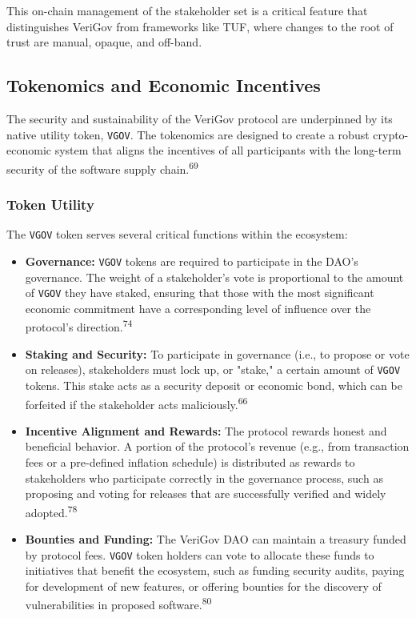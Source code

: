 \documentclass{article}
\begin{document}
This on-chain management of the stakeholder set is a critical feature that distinguishes VeriGov from frameworks like TUF, where changes to the root of trust are manual, opaque, and off-band.

\subsection{Tokenomics and Economic Incentives}

The security and sustainability of the VeriGov protocol are underpinned by its native utility token, \lstinline{VGOV}. The tokenomics are designed to create a robust crypto-economic system that aligns the incentives of all participants with the long-term security of the software supply chain.\textsuperscript{69}

\subsubsection{Token Utility}

The \lstinline{VGOV} token serves several critical functions within the ecosystem:

\begin{itemize}
\item \textbf{Governance:} \lstinline{VGOV} tokens are required to participate in the DAO's governance. The weight of a stakeholder's vote is proportional to the amount of \lstinline{VGOV} they have staked, ensuring that those with the most significant economic commitment have a corresponding level of influence over the protocol's direction.\textsuperscript{74}
\item \textbf{Staking and Security:} To participate in governance (i.e., to propose or vote on releases), stakeholders must lock up, or "stake," a certain amount of \lstinline{VGOV} tokens. This stake acts as a security deposit or economic bond, which can be forfeited if the stakeholder acts maliciously.\textsuperscript{66}
\item \textbf{Incentive Alignment and Rewards:} The protocol rewards honest and beneficial behavior. A portion of the protocol's revenue (e.g., from transaction fees or a pre-defined inflation schedule) is distributed as rewards to stakeholders who participate correctly in the governance process, such as proposing and voting for releases that are successfully verified and widely adopted.\textsuperscript{78}
\item \textbf{Bounties and Funding:} The VeriGov DAO can maintain a treasury funded by protocol fees. \lstinline{VGOV} token holders can vote to allocate these funds to initiatives that benefit the ecosystem, such as funding security audits, paying for development of new features, or offering bounties for the discovery of vulnerabilities in proposed software.\textsuperscript{80}
\end{itemize}
\end{document}

